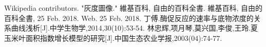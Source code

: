 \documentclass[withoutpreface,bwprint]{cumcmthesis}
\begin{document}
\begin{titlepage}
\centering
\end{titlepage}

\maketitle











\begin{thebibliography}{9}%
     Wikipedia contributors. "灰度圖像." 維基百科, 自由的百科全書. 維基百科, 自由的百科全書, 25 Feb. 2018. Web. 25 Feb. 2018.    
     丁傅.酶促反应的速率与底物浓度的关系曲线浅析[J].中学生物学,2014,30(10):53-54.
     林忠辉,项月琴,莫兴国,李俊,王玲.夏玉米叶面积指数增长模型的研究[J].中国生态农业学报,2003(04):74-77.
   \end{thebibliography}
\end{document}
